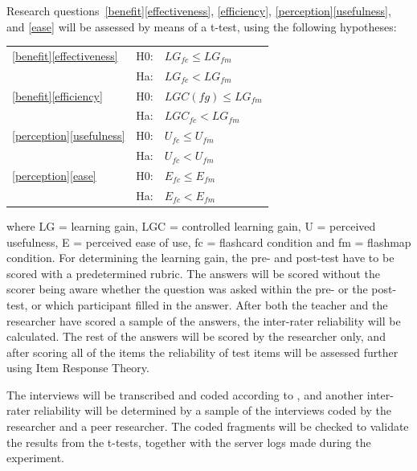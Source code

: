 \documentclass[11pt,twoside]{report} %
\begin{document}

Research questions~\ref{benefit}\ref{effectiveness}, \ref{efficiency}, \ref{perception}\ref{usefulness}, and \ref{ease} will be assessed by means of a t-test, using the following hypotheses: 

\begin{tabular}{l l l}
\ref{benefit}\ref{effectiveness} & H0: & $LG_{fc} \leq LG_{fm}$ \\
                                 & Ha: & $LG_{fc} < LG_{fm}$ \\
\ref{benefit}\ref{efficiency}    & H0: & $LGC(fg) \leq LG_{fm}$ \\
                                 & Ha: & $ LGC_{fc} < LG_{fm}$ \\
\ref{perception}\ref{usefulness} & H0: & $U_{fc} \leq U_{fm}$ \\
                                 & Ha: & $U_{fc} < U_{fm}$ \\
\ref{perception}\ref{ease}       & H0: & $E_{fc} \leq E_{fm}$ \\
                                 & Ha: & $E_{fc} < E_{fm}$ \\
\end{tabular}

\noindent where LG = learning gain, LGC = controlled learning gain, U = perceived usefulness, E = perceived ease of use, fc = flashcard condition and fm = flashmap condition. For determining the learning gain, the pre- and post-test have to be scored with a predetermined rubric. The answers will be scored without the scorer being aware whether the question was asked within the pre- or the post-test, or which participant filled in the answer. After both the teacher and the researcher have scored a sample of the answers, the inter-rater reliability will be calculated. The rest of the answers will be scored by the researcher only, and after scoring all of the items the reliability of test items will be assessed further using Item Response Theory.

The interviews will be transcribed and coded according to , and another inter-rater reliability will be determined by a sample of the interviews coded by the researcher and a peer researcher. The coded fragments will be checked to validate the results from the t-tests, together with the server logs made during the experiment.
\end{document}
